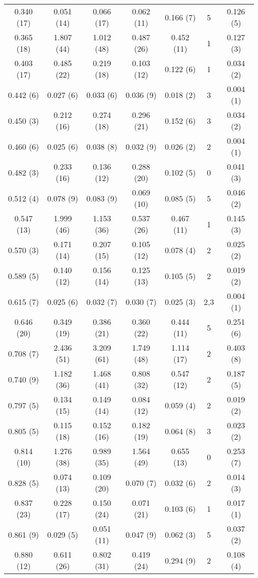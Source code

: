 \begin{table}
\begin{tabular}{c c c c c c c}
0.340 (17) & 0.051 (14) & 0.066 (17) & 0.062 (11) & 0.166 (7) & 5 & 0.126 (5) \\
0.365 (18) & 1.807 (44) & 1.012 (48) & 0.487 (26) & 0.452 (11) & 1 & 0.127 (3) \\
0.403 (17) & 0.485 (22) & 0.219 (18) & 0.103 (12) & 0.122 (6) & 1 & 0.034 (2) \\
0.442 (6) & 0.027 (6) & 0.033 (6) & 0.036 (9) & 0.018 (2) & 3 & 0.004 (1) \\
0.450 (3) & 0.212 (16) & 0.274 (18) & 0.296 (21) & 0.152 (6) & 3 & 0.034 (2) \\
0.460 (6) & 0.025 (6) & 0.038 (8) & 0.032 (9) & 0.026 (2) & 2 & 0.004 (1) \\
0.482 (3) & 0.233 (16) & 0.136 (12) & 0.288 (20) & 0.102 (5) & 0 & 0.041 (3) \\
0.512 (4) & 0.078 (9) & 0.083 (9) & 0.069 (10) & 0.085 (5) & 5 & 0.046 (2) \\
0.547 (13) & 1.999 (46) & 1.153 (36) & 0.537 (26) & 0.467 (11) & 1 & 0.145 (3) \\
0.570 (3) & 0.171 (14) & 0.207 (15) & 0.105 (12) & 0.078 (4) & 2 & 0.025 (2) \\
0.589 (5) & 0.140 (12) & 0.156 (14) & 0.125 (13) & 0.105 (5) & 2 & 0.019 (2) \\
0.615 (7) & 0.025 (6) & 0.032 (7) & 0.030 (7) & 0.025 (3) & 2,3 & 0.004 (1) \\
0.646 (20) & 0.349 (19) & 0.386 (21) & 0.360 (22) & 0.444 (11) & 5 & 0.251 (6) \\
0.708 (7) & 2.436 (51) & 3.209 (61) & 1.749 (48) & 1.114 (17) & 2 & 0.403 (8) \\
0.740 (9) & 1.182 (36) & 1.468 (41) & 0.808 (32) & 0.547 (12) & 2 & 0.187 (5) \\
0.797 (5) & 0.134 (15) & 0.149 (14) & 0.084 (12) & 0.059 (4) & 2 & 0.019 (2) \\
0.805 (5) & 0.115 (18) & 0.152 (16) & 0.182 (19) & 0.064 (8) & 3 & 0.023 (2) \\
0.814 (10) & 1.276 (38) & 0.989 (35) & 1.564 (49) & 0.655 (13) & 0 & 0.253 (7) \\
0.828 (5) & 0.074 (13) & 0.109 (20) & 0.070 (7) & 0.032 (6) & 2 & 0.014 (3) \\
0.837 (23) & 0.228 (17) & 0.150 (24) & 0.071 (21) & 0.103 (6) & 1 & 0.017 (1) \\
0.861 (9) & 0.029 (5) & 0.051 (11) & 0.047 (9) & 0.062 (3) & 5 & 0.037 (2) \\
0.880 (12) & 0.611 (26) & 0.802 (31) & 0.419 (24) & 0.294 (9) & 2 & 0.108 (4) \\

\end{tabular}
\end{table}
